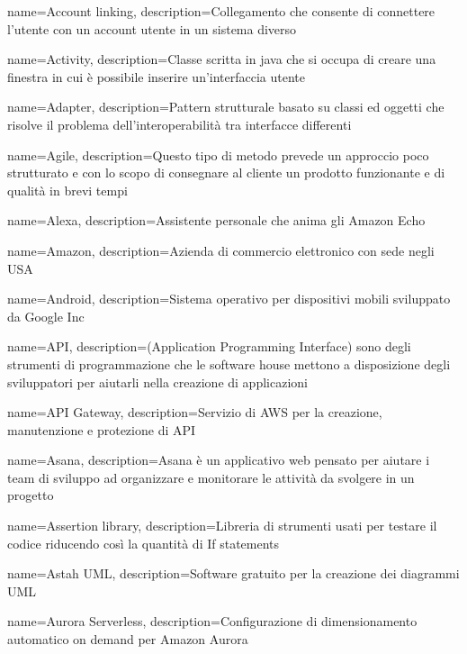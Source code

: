 {
	name={Account linking},
	description={Collegamento che consente di connettere l’utente con un account utente in
		un sistema diverso}
}

{
	name={Activity},
	description={Classe scritta in java che si occupa di creare una finestra in cui è possibile inserire un'interfaccia utente}
}

{
	name={Adapter},
	description={Pattern strutturale basato su classi ed oggetti che risolve il problema dell'interoperabilità tra interfacce differenti}
}

{
	name={Agile},
	description={Questo tipo di metodo prevede un approccio poco strutturato e con lo scopo di consegnare al cliente un prodotto funzionante e di qualità in brevi tempi}
}

{
	name={Alexa},
	description={Assistente personale che anima gli Amazon Echo}
}

{
	name={Amazon},
	description={Azienda di commercio elettronico con sede negli USA}
}

{
	name={Android},
	description={Sistema operativo per dispositivi mobili sviluppato da Google Inc}
}

{
	name={API},
	description={(Application Programming Interface) sono degli strumenti di programmazione che le software house mettono a disposizione degli sviluppatori per aiutarli
		nella creazione di applicazioni}
}

{
	name={API Gateway},
	description={Servizio di AWS per la creazione, manutenzione e protezione di API}
}

{
	name={Asana},
	description={Asana è un applicativo web pensato per aiutare i team di sviluppo ad organizzare e monitorare le attività da svolgere in un progetto}
}

{
	name={Assertion library},
	description={Libreria di strumenti usati per testare il codice riducendo così la quantità di If statements}
}

{
	name={Astah UML},
	description={Software gratuito per la creazione dei diagrammi UML}
}

{
	name={Aurora Serverless},
	description={Configurazione di dimensionamento automatico on demand per Amazon Aurora}
}

